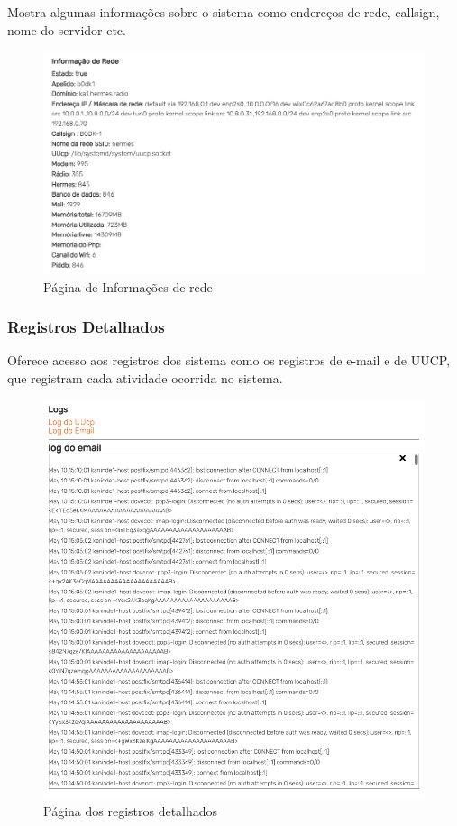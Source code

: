 \documentclass[11pt,a4paper]{article}
\begin{document}
Mostra algumas informações sobre o sistema como endereços de rede, callsign, nome do servidor etc.
     \begin{figure}[H]
     \vspace{-10pt}
    \centering
    \includegraphics[width=0.5\columnwidth]{screenshots/frontend/pt_kn/network.png}
    \caption{Página de Informações de rede}
    \label{fig:netinfo}
  
    \end{figure}
    
 


    
\subsubsection{Registros Detalhados}
Oferece acesso aos registros dos sistema como os registros de e-mail e de UUCP, que registram cada atividade ocorrida no sistema.
    
    \begin{figure}[H]
    \centering
    \includegraphics[width=0.5\columnwidth]{screenshots/frontend/pt_kn/logs.png}
    \caption{Página dos registros detalhados}
    \label{fig:logs}
\end{figure}
\end{document}
